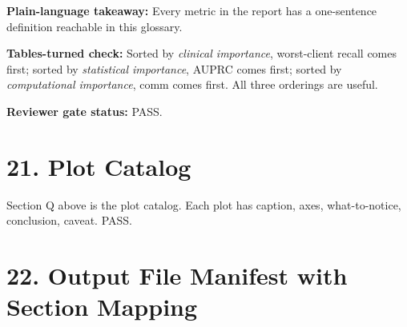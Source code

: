 \documentclass{article}
\begin{document}
\textbf{Plain-language takeaway:} Every metric in the report has a one-sentence definition reachable in this glossary.


\textbf{Tables-turned check:} Sorted by \emph{clinical importance}, worst-client recall comes first; sorted by \emph{statistical importance}, AUPRC comes first; sorted by \emph{computational importance}, comm comes first. All three orderings are useful.


\textbf{Reviewer gate status:} PASS.



\clearpage
\section{21. Plot Catalog}


Section Q above is the plot catalog. Each plot has caption, axes, what-to-notice, conclusion, caveat. PASS.



\clearpage
\section{22. Output File Manifest with Section Mapping}
\end{document}
